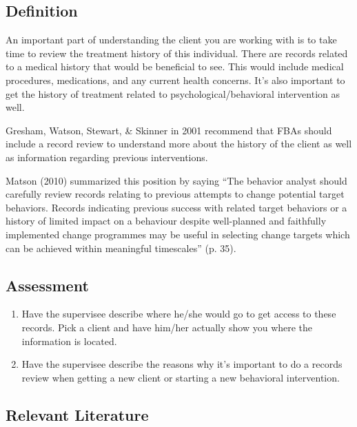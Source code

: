 \subsection{Definition}
An important part of understanding the client you are working with is to take time to review the treatment history of this individual. There are records related to a medical history that would be beneficial to see. This would include medical procedures, medications, and any current health concerns. It's also important to get the history of treatment related to psychological/behavioral intervention as well. 

Gresham, Watson, Stewart, \& Skinner in 2001 recommend that FBAs should include a record review to understand more about the history of the client as well as information regarding previous interventions. 

Matson (2010) summarized this position by saying ``The behavior analyst should carefully review records relating to previous attempts to change potential target behaviors. Records indicating previous success with related target behaviors or a history of limited impact on a behaviour despite well-planned and faithfully implemented change programmes may be useful in selecting change targets which can be achieved within meaningful timescales'' (p. 35).

\subsection{Assessment}
\begin{enumerate}
\item Have the supervisee describe where he/she would go to get access to these records. Pick a client and have him/her actually show you where the information is located.
\item Have the supervisee describe the reasons why it's important to do a records review when getting a new client or starting a new behavioral intervention.
\end{enumerate}
%
\subsection{Relevant Literature}
\begin{refsection}
\nocite{test,alang2017police,clayton2018black}
\printbibliography[heading=none]
\end{refsection}
%
